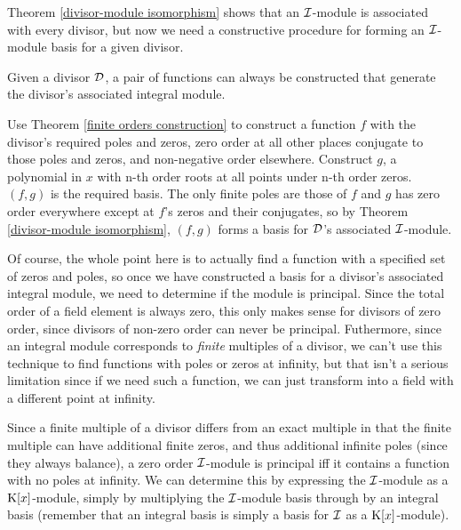 \endtheorem

Theorem \ref{divisor-module isomorphism} shows that an
${\cal I}$-module is associated with every divisor, but
now we need a constructive procedure for forming an ${\cal I}$-module
basis for a given divisor.

\theorem
\label{divisor basis construction}

Given a divisor ${\cal D}$, a pair of functions can always be
constructed that generate the divisor's associated integral module.

\proof

Use Theorem \ref{finite orders construction} to construct a function
$f$ with the divisor's required poles and zeros, zero order at all
other places conjugate to those poles and zeros, and non-negative
order elsewhere.  Construct $g$, a polynomial in $x$ with n-th order
roots at all points under n-th order zeros.  $(f,g)$ is the required
basis.  The only finite poles are those of $f$ and $g$ has zero order
everywhere except at $f$'s zeros and their conjugates, so by Theorem
\ref{divisor-module isomorphism}, $(f,g)$ forms a basis for
${\cal D}$'s associated ${\cal I}$-module.

\endtheorem


Of course, the whole point here is to actually find a function with a
specified set of zeros and poles, so once we have constructed a basis
for a divisor's associated integral module, we need to determine if
the module is principal.  Since the total order of a field element is
always zero, this only makes sense for divisors of zero order, since
divisors of non-zero order can never be principal.  Futhermore, since
an integral module corresponds to {\it finite} multiples of a divisor,
we can't use this technique to find functions with poles or zeros at
infinity, but that isn't a serious limitation since if we need such a
function, we can just transform into a field with a different point at
infinity.

Since a finite multiple of a divisor differs from an exact multiple in
that the finite multiple can have additional finite zeros, and thus
additional infinite poles (since they always balance), a zero order
${\cal I}$-module is principal iff it contains a function with no
poles at infinity.  We can determine this by expressing the ${\cal
I}$-module as a ${\rm K}[x]$-module, simply by multiplying the ${\cal
I}$-module basis through by an integral basis (remember that an
integral basis is simply a basis for ${\cal I}$ as a ${\rm
K}[x]$-module).


